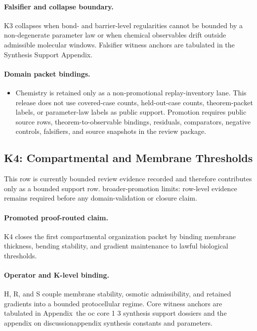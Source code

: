 \paragraph{Falsifier and collapse boundary.}
K3 collapses when bond- and barrier-level regularities cannot be bounded by a non-degenerate parameter law or when chemical observables drift outside admissible molecular windows.
Falsifier witness anchors are tabulated in the Synthesis Support Appendix.

\paragraph{Domain packet bindings.}
\begin{itemize}[leftmargin=1.6em,nosep]
\item Chemistry is retained only as a non-promotional replay-inventory lane. This release does not use covered-case counts, held-out-case counts, theorem-packet labels, or parameter-law labels as public support. Promotion requires public source rows, theorem-to-observable bindings, residuals, comparators, negative controls, falsifiers, and source snapshots in the review package.
\end{itemize}

\subsection{K4: Compartmental and Membrane Thresholds}
\label{sec:oc-core-1-3-synthesis-k4}
This row is currently bounded review evidence recorded and therefore contributes only as a bounded support row.
broader-promotion limits: row-level evidence remains required before any domain-validation or closure claim.

\paragraph{Promoted proof-routed claim.}
K4 closes the first compartmental organization packet by binding membrane thickness, bending stability, and gradient maintenance to lawful biological thresholds.

\paragraph{Operator and K-level binding.}
H, R, and S couple membrane stability, osmotic admissibility, and retained gradients into a bounded protocellular regime.
Core witness anchors are tabulated in Appendix~the oc core 1 3 synthesis support dossiers and the appendix on discussionappendix synthesis constants and parameters.

